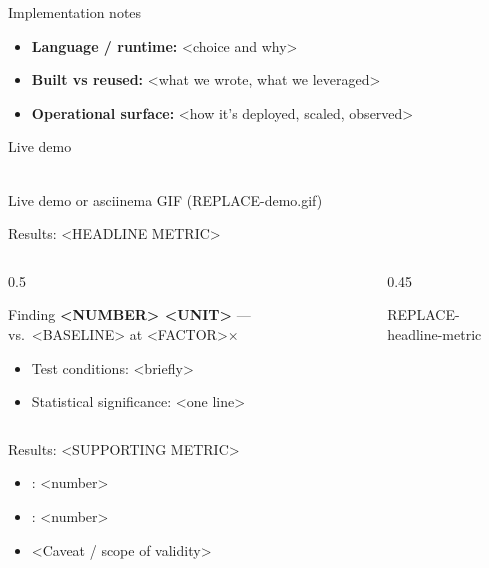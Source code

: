 \documentclass[aspectratio=169,12pt]{beamer}
\begin{document}
\begin{frame}{Implementation notes}
  \begin{itemize}
    \item \textbf{Language / runtime:} <choice and why>
    \item \textbf{Built vs reused:} <what we wrote, what we leveraged>
    \item \textbf{Operational surface:} <how it's deployed, scaled, observed>
  \end{itemize}
\end{frame}

\begin{frame}{Live demo}
  \begin{center}
    \fbox{\rule{0pt}{5cm}\rule{0.85\textwidth}{0pt}}\\
    \footnotesize Live demo or asciinema GIF (REPLACE-demo.gif)
  \end{center}
\end{frame}

\begin{frame}{Results: <HEADLINE METRIC>}
  \begin{columns}[T]
    \begin{column}{0.5\textwidth}
      \begin{block}{Finding}
        \textbf{<NUMBER> <UNIT>} --- vs.\ <BASELINE> at <FACTOR>$\times$
      \end{block}
      \begin{itemize}
        \item Test conditions: <briefly>
        \item Statistical significance: <one line>
      \end{itemize}
    \end{column}
    \begin{column}{0.45\textwidth}
      \fbox{\rule{0pt}{4.5cm}\rule{\textwidth}{0pt}}
      \begin{center}\footnotesize REPLACE-headline-metric\end{center}
    \end{column}
  \end{columns}
\end{frame}

\begin{frame}{Results: <SUPPORTING METRIC>}
  \begin{itemize}
    \item <Sub-metric 1>: <number>
    \item <Sub-metric 2>: <number>
    \item <Caveat / scope of validity>
  \end{itemize}
\end{frame}
\end{document}
